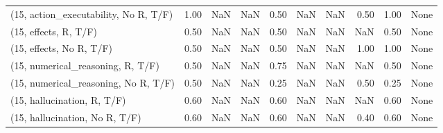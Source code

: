 \begin{table*}[h!]
\begin{adjustbox}{width=2\columnwidth,center}
\begin{tabular}{lrrr|rrr|rrr}
(15, action\_executability, No R, T/F) &                      1.00 &                   NaN &                       NaN &                          0.50 &                       NaN &                           NaN &                                   0.50 &                               1.00 &                                  None \\
(15, effects, R, T/F)                 &                      0.50 &                   NaN &                       NaN &                          0.50 &                       NaN &                           NaN &                                    NaN &                               0.50 &                                  None \\
(15, effects, No R, T/F)              &                      0.50 &                   NaN &                       NaN &                          0.50 &                       NaN &                           NaN &                                   1.00 &                               1.00 &                                  None \\
(15, numerical\_reasoning, R, T/F)     &                      0.50 &                   NaN &                       NaN &                          0.75 &                       NaN &                           NaN &                                    NaN &                               0.50 &                                  None \\
(15, numerical\_reasoning, No R, T/F)  &                      0.50 &                   NaN &                       NaN &                          0.25 &                       NaN &                           NaN &                                   0.50 &                               0.25 &                                  None \\
(15, hallucination, R, T/F)           &                      0.60 &                   NaN &                       NaN &                          0.60 &                       NaN &                           NaN &                                    NaN &                               0.60 &                                  None \\
(15, hallucination, No R, T/F)        &                      0.60 &                   NaN &                       NaN &                          0.60 &                       NaN &                           NaN &                                   0.40 &                               0.60 &                                  None \\

\end{tabular}
\end{adjustbox}
\end{table*}
